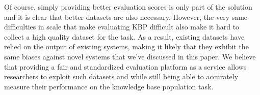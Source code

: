 Of course, simply providing better evaluation scores is only part of the solution and it is clear that better datasets are also necessary.
However, the very same difficulties in scale that make evaluating KBP difficult also make it hard to collect a high quality dataset for the task.
As a result, existing datasets \citep{angeli2014combining,adel2016comparing} have relied on the output of existing systems, making it likely that they exhibit the same biases against novel systems that we've discussed in this paper.
We believe that providing a fair and standardized evaluation platform as a service
allows researchers to exploit such datasets and while still being able to accurately measure their performance on the knowledge base population task.

